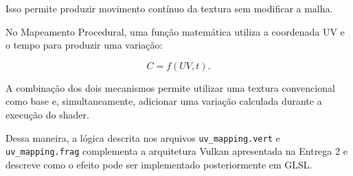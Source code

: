 Isso permite produzir movimento contínuo da textura sem modificar a malha.

No Mapeamento Procedural, uma função matemática utiliza a coordenada UV e o
tempo para produzir uma variação:

\begin{equation}
C=f(UV,t).
\end{equation}

A combinação dos dois mecanismos permite utilizar uma textura convencional
como base e, simultaneamente, adicionar uma variação calculada durante a
execução do shader.

Dessa maneira, a lógica descrita nos arquivos \texttt{uv\_mapping.vert} e
\texttt{uv\_mapping.frag} complementa a arquitetura Vulkan apresentada na
Entrega 2 e descreve como o efeito pode ser implementado posteriormente em
GLSL.